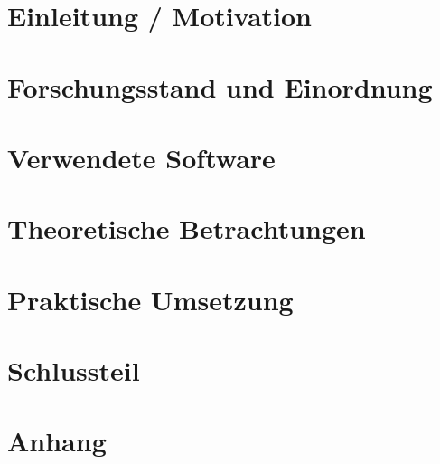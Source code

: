 \documentclass[12pt]{scrreprt}
\theoremstyle{remark}
\begin{document}
\singlespacing
\tableofcontents

\onehalfspacing

\chapter{Einleitung / Motivation}
\label{chap:introduction}


\chapter{Forschungsstand und Einordnung}
\label{chap:forschung}


\chapter{Verwendete Software}
\label{chap:software}


\chapter{Theoretische Betrachtungen}
\label{chap:theorie}



\chapter{Praktische Umsetzung}
\label{chap:praxis}


\chapter{Schlussteil}
\label{chap:ausblick}


%
\printbibliography



\chapter{Anhang}




\end{document}
